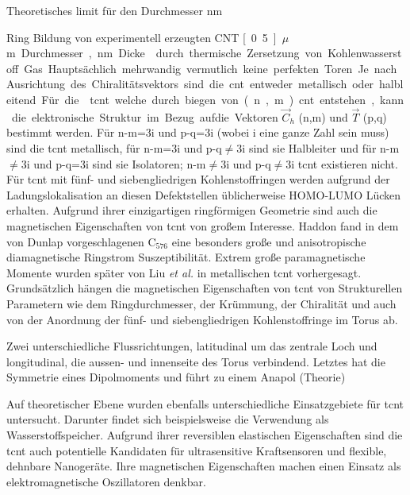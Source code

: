 Theoretisches limit für den Durchmesser \unit[200]{nm}\supercite{meunier1998atomic}

Ring Bildung von experimentell erzeugten CNT \unit[0.5]{$\mu$m} Durchmesser, \unit[20]{nm} Dicke\supercite{ahlskog1999ring} durch thermische Zersetzung von Kohlenwasserstoff Gas. Hauptsächlich mehrwandig vermutlich keine perfekten Toren

Je nach Ausrichtung des Chiralitätsvektors sind die \ac{cnt} entweder metallisch oder halbleitend. Für die \supercite{saito1998physical} \ac{tcnt} welche durch biegen von (n,m) \ac{cnt} entstehen, kann die elektronische Struktur im Bezug aufdie Vektoren $\vec{C}_h$ (n,m) und $\vec{T}$ (p,q) bestimmt werden.\supercite{ceulemans2000electronic} Für n-m=3i und p-q=3i (wobei i eine ganze Zahl sein muss) sind die \ac{tcnt} metallisch, für n-m=3i und p-q$\neq$3i sind sie Halbleiter und für n-m$\neq$3i und p-q=3i sind sie Isolatoren; n-m$\neq$3i und p-q$\neq$3i \ac{tcnt} existieren nicht.\supercite{zhang2005electronic} Für \ac{tcnt} mit fünf- und siebengliedrigen Kohlenstoffringen werden aufgrund der Ladungslokalisation an diesen Defektstellen üblicherweise HOMO-LUMO Lücken erhalten.\supercite{meunier1998atomic,oh2000structures,yazgan2004electronic,wu2011density} Aufgrund ihrer einzigartigen ringförmigen Geometrie sind auch die magnetischen Eigenschaften von \ac{tcnt} von großem Interesse. Haddon fand in dem von Dunlap vorgeschlagenen C$_{576}$ eine besonders große und anisotropische diamagnetische Ringstrom Suszeptibilität.\supercite{haddon1997electronic} Extrem große paramagnetische Momente wurden später von Liu \textit{et al.}\supercite{liu2002colossal} in metallischen \ac{tcnt} vorhergesagt. Grundsätzlich hängen die magnetischen Eigenschaften von \ac{tcnt} von Strukturellen Parametern wie dem Ringdurchmesser, der Krümmung, der Chiralität und auch von der Anordnung der fünf- und siebengliedrigen Kohlenstoffringe im Torus ab.\supercite{tsai2004magnetization,liu2007magnetic,liu2008magnetic}

Zwei unterschiedliche Flussrichtungen, latitudinal um das zentrale Loch und longitudinal, die aussen- und innenseite des Torus verbindend. Letztes hat die Symmetrie eines Dipolmoments und führt zu einem Anapol\supercite{ceulemans1998molecular} (Theorie) 

Auf theoretischer Ebene wurden ebenfalls unterschiedliche Einsatzgebiete für \ac{tcnt} untersucht. Darunter findet sich beispielsweise die Verwendung als Wasserstoffspeicher\supercite{castillo2010hydrogen,cruz2010hydrogen}. Aufgrund ihrer reversiblen elastischen Eigenschaften sind die \ac{tcnt} auch potentielle Kandidaten für ultrasensitive Kraftsensoren und flexible, dehnbare Nanogeräte. Ihre magnetischen Eigenschaften machen einen Einsatz als elektromagnetische Oszillatoren denkbar.\supercite{liu2014curved}

